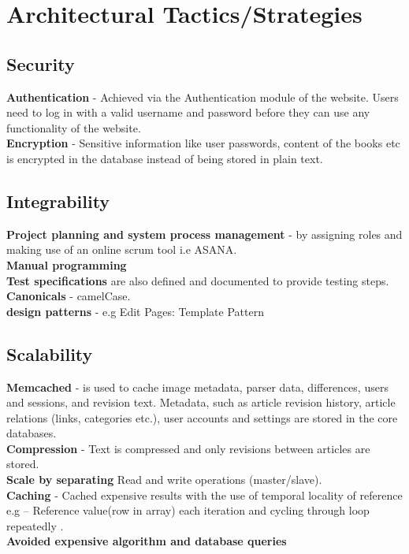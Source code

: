 \section{Architectural Tactics/Strategies}

\subsection{Security}
\par{\textbf{Authentication} - Achieved via the Authentication module of the website. Users need to log in with a valid username and password before they can use any functionality of the website. \\\textbf{Encryption} - Sensitive information like user passwords, content of the books etc is encrypted in the database instead of being stored in plain text. }

\subsection{Integrability}
\par{\textbf{Project planning and system process management} - by assigning roles and making use of an online scrum tool i.e ASANA.
\\\textbf{Manual programming}
\\\textbf{Test specifications} are also defined and documented to provide testing steps.
\\\textbf{Canonicals} - camelCase.
\\\textbf{design patterns} - e.g Edit Pages: Template Pattern}

\subsection{Scalability}
\par{\textbf{Memcached} - is used to cache image metadata, parser data, differences, users and sessions, and revision text. Metadata, such as article revision history, article relations (links, categories etc.), user accounts and settings are stored in the core databases.
\\\textbf{Compression} - Text is compressed and only revisions between articles are stored. 
\\\textbf{Scale by separating} Read and write operations (master/slave).
\\\textbf{Caching} - Cached expensive results with the use of temporal locality of reference e.g – Reference value(row in array) each iteration and cycling through loop repeatedly .
\\\textbf{Avoided expensive algorithm and database queries}
}
